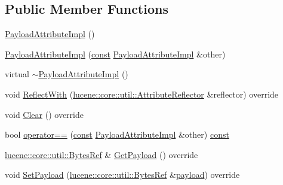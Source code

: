 \subsection*{Public Member Functions}
\begin{DoxyCompactItemize}
\item 
\mbox{\hyperlink{classlucene_1_1core_1_1analysis_1_1tokenattributes_1_1PayloadAttributeImpl_a3f2e143ad91331fdb3123171aeba2b5b}{Payload\+Attribute\+Impl}} ()
\item 
\mbox{\hyperlink{classlucene_1_1core_1_1analysis_1_1tokenattributes_1_1PayloadAttributeImpl_ab110d44b86e2a332642d5b9f3166ef48}{Payload\+Attribute\+Impl}} (\mbox{\hyperlink{ZlibCrc32_8h_a2c212835823e3c54a8ab6d95c652660e}{const}} \mbox{\hyperlink{classlucene_1_1core_1_1analysis_1_1tokenattributes_1_1PayloadAttributeImpl}{Payload\+Attribute\+Impl}} \&other)
\item 
virtual \mbox{\hyperlink{classlucene_1_1core_1_1analysis_1_1tokenattributes_1_1PayloadAttributeImpl_a03a337d859f174328c1b92ee46daf42c}{$\sim$\+Payload\+Attribute\+Impl}} ()
\item 
void \mbox{\hyperlink{classlucene_1_1core_1_1analysis_1_1tokenattributes_1_1PayloadAttributeImpl_ab012363b8b4ce7e15c9c91ba6ec0c325}{Reflect\+With}} (\mbox{\hyperlink{namespacelucene_1_1core_1_1util_a7dbb701adaed055f73fb95eec83da10a}{lucene\+::core\+::util\+::\+Attribute\+Reflector}} \&reflector) override
\item 
void \mbox{\hyperlink{classlucene_1_1core_1_1analysis_1_1tokenattributes_1_1PayloadAttributeImpl_a264f13a218ec4caca8c724e3c34f64b6}{Clear}} () override
\item 
bool \mbox{\hyperlink{classlucene_1_1core_1_1analysis_1_1tokenattributes_1_1PayloadAttributeImpl_a2022641a26ad34c34b75cf47caf2f223}{operator==}} (\mbox{\hyperlink{ZlibCrc32_8h_a2c212835823e3c54a8ab6d95c652660e}{const}} \mbox{\hyperlink{classlucene_1_1core_1_1analysis_1_1tokenattributes_1_1PayloadAttributeImpl}{Payload\+Attribute\+Impl}} \&other) \mbox{\hyperlink{ZlibCrc32_8h_a2c212835823e3c54a8ab6d95c652660e}{const}}
\item 
\mbox{\hyperlink{classlucene_1_1core_1_1util_1_1BytesRef}{lucene\+::core\+::util\+::\+Bytes\+Ref}} \& \mbox{\hyperlink{classlucene_1_1core_1_1analysis_1_1tokenattributes_1_1PayloadAttributeImpl_a60adf0536ed3492e2cbfc2f59846ff8d}{Get\+Payload}} () override
\item 
void \mbox{\hyperlink{classlucene_1_1core_1_1analysis_1_1tokenattributes_1_1PayloadAttributeImpl_a69b9a7d6938f53e84dff76d6a0e9c2f3}{Set\+Payload}} (\mbox{\hyperlink{classlucene_1_1core_1_1util_1_1BytesRef}{lucene\+::core\+::util\+::\+Bytes\+Ref}} \&\mbox{\hyperlink{classlucene_1_1core_1_1analysis_1_1tokenattributes_1_1PayloadAttributeImpl_ac5bd28a25a555ffb21b75fda1036def1}{payload}}) override

\end{DoxyCompactItemize}
